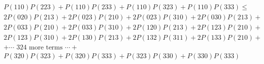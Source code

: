 \begin{gather*}
	P(110)P(223) + P(110)P(233) + P(110)P(323) + P(110)P(333) \leq \\
	2P(020)P(213) + 2P(023)P(210) + 2P(023)P(310) + 2P(030)P(213) + \\
    2P(033)P(210) + 2P(033)P(310) + 2P(120)P(213) + 2P(123)P(210) + \\
    2P(123)P(310) + 2P(130)P(213) + 2P(132)P(311) + 2P(133)P(210) + \\
	+ \cdots \text{ 324 more terms } \cdots + \\
    P(320)P(323) + P(320)P(333) + P(323)P(330) + P(330)P(333)
\end{gather*}